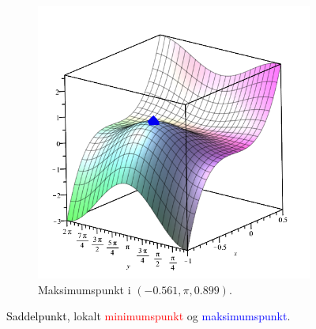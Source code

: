 \documentclass{report}
\begin{document}
\begin{figure}[H]
\begin{subfigure}[b]{0.4\textwidth}
        \includegraphics[width=\textwidth]{max.png}
        \caption{Maksimumspunkt i $(-0.561,\pi,0.899)$.}
    \end{subfigure}
    \caption{\textcolor{black}{Saddelpunkt}, lokalt \textcolor{red}{minimumspunkt} og \textcolor{blue}{maksimumspunkt}.}
\end{figure}
\end{document}
